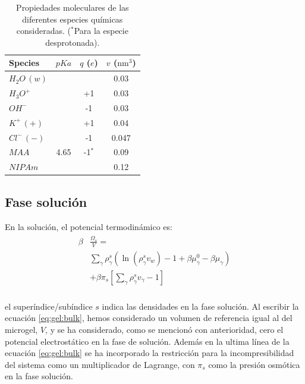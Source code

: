 \begin{table}
	\centering
\begin{tabular}{|lccc|}
    \hline
    {Species} & {$pKa$} & {$q$ ($e$)} & {$v$ ($\text{nm}^3$)} \\
      \hline
$H_2O\,(w)$ & ~ & ~ & 0.03\\
$H_3O^+$ & ~ & +1 & 0.03\\
$OH^-$ & ~ & -1 & 0.03\\
$K^+\,(+)$ & ~ & +1 & 0.04\\ 
$Cl^-\,(-)$ & ~ & -1 & 0.047\\
$MAA$ & 4.65 & -1$^\ast$ & 0.09\\
$NIPAm$ & ~ & ~ & 0.12\\
    \hline
  \end{tabular}
 \caption{Propiedades moleculares de las diferentes especies qu\'imicas consideradas.
 	($^\ast$Para la especie desprotonada).}
\label{table:gel:molecules} 
\end{table}


\subsection{Fase soluci\'on}\label{sec:gel:fase-solucion}

En la soluci\'on, el potencial termodin\'amico es:
%
%
\begin{align}
\begin{aligned}
\beta&\frac{\Omega_s}{V}=\\& \sum_{\gamma   } {\rho^s_\gamma\left(\ln(\rho_\gamma^sv_w) -1 + \beta\mu_\gamma^0 - \beta\mu_\gamma\right)} \\
& +\beta\pi_{s} \left[ \sum_{\gamma } \rho^s_\gamma v_\gamma  -1 \right] \\
\end{aligned}
\label{eq:gel:bulk}
\end{align}

\noindent el super\'indice/sub\'indice  $s$  indica las densidades en la fase soluci\'on.
Al escribir la ecuaci\'on \ref{eq:gel:bulk}, hemos considerado un volumen de referencia igual al del microgel, $V$, y se ha considerado, como se mencion\'o con anterioridad, cero el potencial electrost\'atico en la fase de soluci\'on.
Adem\'as en la ultima l\'inea de la ecuaci\'on \ref{eq:gel:bulk} se ha incorporado la restricci\'on para la incompresibilidad del sistema como un multiplicador de Lagrange, con $\pi_s$ como la presi\'on osm\'otica en la fase soluci\'on.

